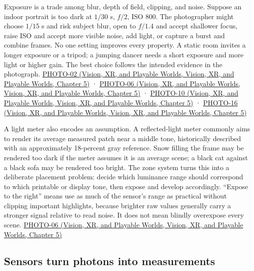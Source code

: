 Exposure is a trade among blur, depth of field, clipping, and noise. Suppose an indoor portrait is too dark at \(1/30\) s, \(f/2\), ISO 800. The photographer might choose \(1/15\) s and risk subject blur, open to \(f/1.4\) and accept shallower focus, raise ISO and accept more visible noise, add light, or capture a burst and combine frames. No one setting improves every property. A static room invites a longer exposure or a tripod; a jumping dancer needs a short exposure and more light or higher gain. The best choice follows the intended evidence in the photograph. \href{../07-Vision-XR-and-Playable-Worlds/main.pdf\#nameddest=04-visual-computing-ii-ch036-photo-02---photography-session-02}{PHOTO-02 (Vision, XR, and Playable Worlds, Vision, XR, and Playable Worlds, Chapter 5)} · \href{../07-Vision-XR-and-Playable-Worlds/main.pdf\#nameddest=04-visual-computing-ii-ch036-photo-06---photography-session-06}{PHOTO-06 (Vision, XR, and Playable Worlds, Vision, XR, and Playable Worlds, Chapter 5)} · \href{../07-Vision-XR-and-Playable-Worlds/main.pdf\#nameddest=04-visual-computing-ii-ch036-photo-10---photography-session-10}{PHOTO-10 (Vision, XR, and Playable Worlds, Vision, XR, and Playable Worlds, Chapter 5)} · \href{../07-Vision-XR-and-Playable-Worlds/main.pdf\#nameddest=04-visual-computing-ii-ch036-photo-16---photography-session-16}{PHOTO-16 (Vision, XR, and Playable Worlds, Vision, XR, and Playable Worlds, Chapter 5)}

A light meter also encodes an assumption. A reflected-light meter commonly aims to render its average measured patch near a middle tone, historically described with an approximately 18-percent gray reference. Snow filling the frame may be rendered too dark if the meter assumes it is an average scene; a black cat against a black sofa may be rendered too bright. The zone system turns this into a deliberate placement problem: decide which luminance range should correspond to which printable or display tone, then expose and develop accordingly. ``Expose to the right'' means use as much of the sensor's range as practical without clipping important highlights, because brighter raw values generally carry a stronger signal relative to read noise. It does not mean blindly overexpose every scene. \href{../07-Vision-XR-and-Playable-Worlds/main.pdf\#nameddest=04-visual-computing-ii-ch036-photo-06---photography-session-06}{PHOTO-06 (Vision, XR, and Playable Worlds, Vision, XR, and Playable Worlds, Chapter 5)}

\subsection{Sensors turn photons into measurements}\label{03-visual-computing-i-ch003-sensors-turn-photons-into-measurements}

